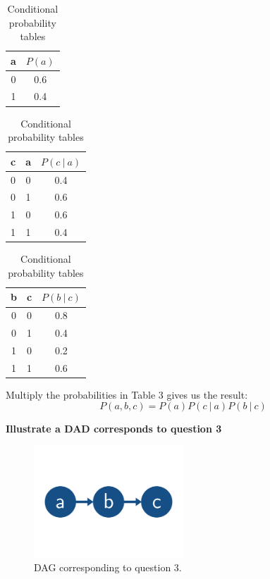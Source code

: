 \documentclass[12pt,twoside]{article}
\begin{document}
\begin{exercises}
\begin{table}[hb!]
  \begin{subtable}{.3\linewidth}
    \centering
      \begin{tabular}{c|c}
        a & $P(a)$ \\ \hline
        0 & 0.6 \\
        1 & 0.4 \\
      \end{tabular}
      \caption{$P(a)$}
  \end{subtable}
  \begin{subtable}{.3\linewidth}
    \centering
      \begin{tabular}{cc|c}
        c & a & $P(c \ | \ a)$ \\ \hline
        0 & 0 & 0.4 \\
        0 & 1 & 0.6 \\
        1 & 0 & 0.6 \\
        1 & 1 & 0.4 \\
      \end{tabular}
      \caption{$P(a)$}
  \end{subtable}
  \begin{subtable}{.3\linewidth}
    \centering
      \begin{tabular}{cc|c}
        b & c & $P(b \ | \ c)$ \\ \hline
        0 & 0 & 0.8 \\
        0 & 1 & 0.4 \\
        1 & 0 & 0.2 \\
        1 & 1 & 0.6 \\
      \end{tabular}
      \caption{$P(a)$}
  \end{subtable}

  \caption{Conditional probability tables}
\end{table}

Multiply the probabilities in Table 3 gives us the result:
$$ P(a,b,c) = P(a)P(c \ | \ a)P(b \ | \ c) $$
\fi

\pagebreak

\problem \textbf{Illustrate a DAD corresponds to question 3}

\ifsolution \solution{}
\begin{figure}[h!]
  \centering
  \includegraphics[width=0.5\textwidth]{dag}
  \caption{DAG corresponding to question 3.}
\end{figure}

\fi

\end{exercises}
\end{document}
